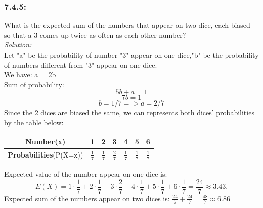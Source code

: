 \documentclass[a4paper]{article}
\begin{document}
\subsubsection*{7.4.5:}
What is the expected sum of the numbers that appear on
two dice, each biased so that a 3 comes up twice as often as each other number?\\
\textit{Solution:}\\
Let "a" be the probability of number "3" appear on one dice,"b" be the probability of numbers different from "3" appear on one dice.\\
We have: a = 2b\\
Sum of probability:
\begin{equation*}
	5b+a=1
\end{equation*}
\begin{equation*}
	7b=1
\end{equation*}
\begin{equation*}
	b=1/7 => a=2/7
\end{equation*}
Since the 2 dices are biased the same, we can represents both dices' probabilities by the table below:
\begin{center}
	\begin{tabular}{ |c|c|c|c|c|c|c| }
		\hline
		\textbf{Number}(x)             & 1             & 2             & 3             & 4             & 5             & 6             \\ 
		\hline 
		\textbf{Probabilities}(P(X=x)) & $\frac{1}{7}$ & $\frac{1}{7}$ & $\frac{2}{7}$ & $\frac{1}{7}$ & $\frac{1}{7}$ & $\frac{1}{7}$ \\ 
		\hline
	\end{tabular}
\end{center}
Expected value of the number appear on one dice is:
\begin{equation*}
	E(X)=1\cdot\frac{1}{7}+2\cdot\frac{1}{7}+3\cdot\frac{2}{7}+4\cdot\frac{1}{7}+5\cdot\frac{1}{7}+6\cdot\frac{1}{7}=\frac{24}{7}\approx3.43. 
\end{equation*}
Expected sum of the numbers appear on two dices is:
$\frac{24}{7}+\frac{24}{7}=\frac{48}{7}\approx 6.86$
\end{document}
